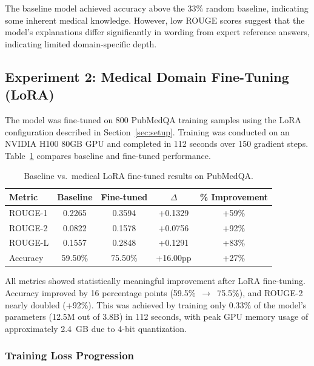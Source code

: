 \documentclass[12pt, letterpaper]{article}
\begin{document}
The baseline model achieved accuracy above the 33\% random baseline, indicating some inherent medical knowledge. However, low ROUGE scores suggest that the model's explanations differ significantly in wording from expert reference answers, indicating limited domain-specific depth.

\subsection{Experiment 2: Medical Domain Fine-Tuning (LoRA)}

The model was fine-tuned on 800 PubMedQA training samples using the LoRA configuration described in Section~\ref{sec:setup}. Training was conducted on an NVIDIA H100 80GB GPU and completed in 112 seconds over 150 gradient steps. Table~\ref{tab:medical-ft-results} compares baseline and fine-tuned performance.

\begin{table}[H]
\centering
\caption{Baseline vs.\ medical LoRA fine-tuned results on PubMedQA.}
\label{tab:medical-ft-results}
\begin{tabular}{lcccc}
\toprule
\textbf{Metric} & \textbf{Baseline} & \textbf{Fine-tuned} & \textbf{$\Delta$} & \textbf{\% Improvement} \\
\midrule
ROUGE-1          & 0.2265            & 0.3594              & +0.1329           & +59\% \\
ROUGE-2          & 0.0822            & 0.1578              & +0.0756           & +92\% \\
ROUGE-L          & 0.1557            & 0.2848              & +0.1291           & +83\% \\
Accuracy         & 59.50\%           & 75.50\%             & +16.00pp          & +27\% \\
\bottomrule
\end{tabular}
\end{table}

All metrics showed statistically meaningful improvement after LoRA fine-tuning. Accuracy improved by 16 percentage points (59.5\%~$\rightarrow$~75.5\%), and ROUGE-2 nearly doubled (+92\%). This was achieved by training only 0.33\% of the model's parameters (12.5M out of 3.8B) in 112 seconds, with peak GPU memory usage of approximately 2.4~GB due to 4-bit quantization.

\subsubsection{Training Loss Progression}
\end{document}
